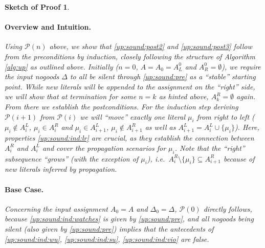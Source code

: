\documentclass[final]{vutinfth} %
\newtheorem{proof-sketch}{Sketch of Proof}[chapter]
\newcommand{\ass}{A}
\newcommand{\welf}{well formed\xspace}
\newcommand{\sgl}{\mu}
\begin{document}
\begin{proof-sketch}
\paragraph{Overview and Intuition.} Using $\mathcal{P}(n)$ above, we show that \ref{up:sound:post2} and \ref{up:sound:post3} follow from the preconditions by induction, closely following the structure of Algorithm \ref{alg:up} as outlined above. Initially ($n = 0$, $\ass = \ass_0 = \ass_L^0$ and $\ass_R^0 = \emptyset$), we require the input nogoods $\Delta$ to all be silent through \ref{up:sound:pre} as a \enquote{stable} starting point. While new literals will be appended to the assignment on the \enquote{right} side, we will show that at termination for some $n = k$ as hinted above, $\ass_k^R = \emptyset$ again. From there we establish the postconditions. For the induction step deriving $\mathcal{P}(i + 1)$ from $\mathcal{P}(i)$ we will \enquote{move} exactly one literal $\sgl_i$ from right to left ($\sgl_i \not \in \ass_i^L$, $\sgl_i \in \ass_i^R$ and $\sgl_i \in \ass_{i+1}^L$, $\sgl_i \not \in \ass_{i+1}^R$ as well as $\ass_{i+1}^L = \ass_{i}^L \cup \{ \sgl_i \}$). Here, properties \ref{up:sound:ind:lr} are crucial, as they establish the connection between $A_i^R$ and $A_i^L$ and cover the propagation scenarios for $\sgl_i$. Note that the \enquote{right} subsequence \enquote{grows} (with the exception of $\sgl_i$), i.e.~$\ass_{i}^R \setminus \{ \sgl_i \} \subseteq \ass_{i+1}^R$ because of new literals inferred by propagation.

\paragraph{Base Case.} Concerning the input assignment $\ass_0 = \ass$ and $\Delta_0 = \Delta$, $\mathcal{P}(0)$ directly follows, because \ref{up:sound:ind:watches} is given by \ref{up:sound:pre}, and all nogoods being silent (also given by \ref{up:sound:pre}) implies that the antecedents of \ref{up:sound:ind:wu}, \ref{up:sound:ind:su}, \ref{up:sound:ind:vio} are false.




\end{proof-sketch}
\end{document}
